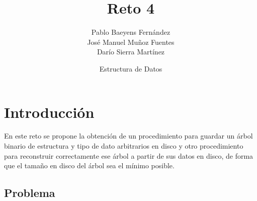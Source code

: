 \documentclass{article}
\title{Reto 4}
\date{Estructura de Datos}
\author{Pablo Baeyens Fernández\\José Manuel Muñoz Fuentes\\Darío Sierra Martínez}
\begin{document}
\maketitle

\section{Introducción}

En este reto se propone la obtención de un procedimiento para guardar un árbol
binario de estructura y tipo de dato arbitrarios en disco y otro procedimiento
para reconstruir correctamente ese árbol a partir de sus datos en disco, de forma
que el tamaño en disco del árbol sea el mínimo posible. \\

\subsection{Problema}

\end{document}
